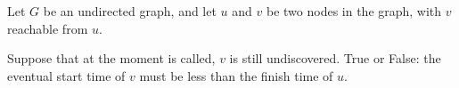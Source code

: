 \begin{prob}

    Let $G$ be an undirected graph, and let $u$ and $v$ be two nodes in the graph, with $v$ reachable from
    $u$.

    Suppose that at the moment  is called, $v$ is still
    undiscovered. True or False: the eventual start time of $v$ must be less
    than the finish time of $u$.

    \tF{}

\end{prob}
